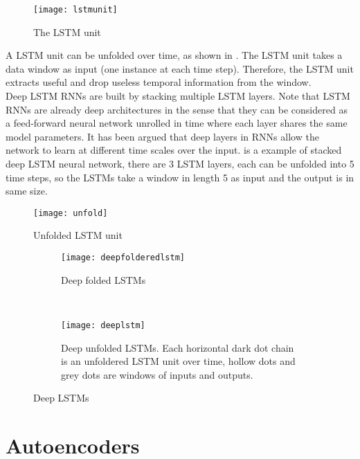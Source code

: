 \begin{figure}[ht]
\centering
\texttt{[image: lstmunit]}
\caption[LSTM unit]{The LSTM unit}
\label{fig:lstmunit}
\end{figure}


A LSTM unit can be unfolded over time, as shown in . The LSTM unit takes a data window as input (one instance at each time step). Therefore, the LSTM unit extracts useful and drop useless temporal information from the window.\\


Deep LSTM RNNs are built by stacking multiple LSTM layers. Note that LSTM RNNs are already deep architectures in the sense that they can be considered as a feed-forward neural network unrolled in time where each layer shares the same model parameters. It has been argued that deep layers in RNNs allow the network to learn at different time scales over the input\cite{deep}.  is a example of stacked deep LSTM neural network, there are 3 LSTM layers, each can be unfolded into 5 time steps, so the LSTMs take a window in length 5 as input and the output is in same size.\\

\begin{figure}[h]
\centering
\texttt{[image: unfold]}
\caption[Unfolded LSTM unit]{Unfolded LSTM unit}
\label{fig:unfolded}
\end{figure}

\begin{figure}[h]
\centering
	\begin {subfigure}[t]{0.45\textwidth}
	\centering
	\texttt{[image: deepfolderedlstm]}
	\caption{Deep folded LSTMs}
	\label{fig:deeplstm1}
	\end{subfigure}
	~
	\begin {subfigure}[t]{0.45\textwidth}
	\centering
	\texttt{[image: deeplstm]}
	\caption{Deep unfolded LSTMs. Each horizontal dark dot chain is an unfoldered LSTM unit over time, hollow dots and grey dots are windows of inputs and outputs.}
	\label{fig:deeplstm2}
	\end{subfigure}
	\caption[Deep LSTMs]{Deep LSTMs}
\label{fig:deeplstm}

\end{figure}

\section{Autoencoders}
\label{sec:Autoencoders}

